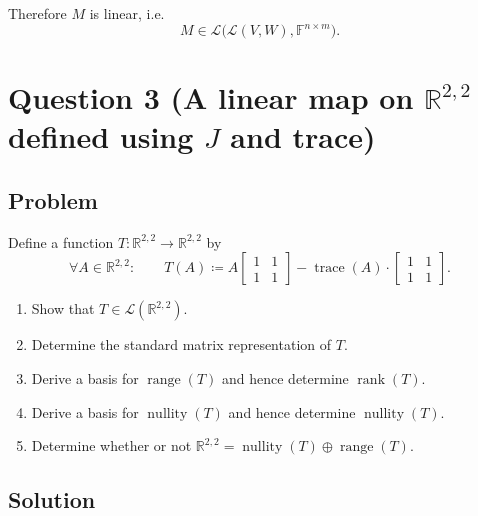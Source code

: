 \documentclass[12pt]{article}
\newcommand{\F}{\mathbb{F}}
\newcommand{\R}{\mathbb{R}}
\newcommand{\cL}{\mathcal{L}}
\DeclareMathOperator{\Range}{range}
\DeclareMathOperator{\Rank}{rank}
\DeclareMathOperator{\Nullity}{nullity}
\DeclareMathOperator{\Null}{nullity}
\DeclareMathOperator{\tr}{trace}
\begin{document}
Therefore $M$ is linear, i.e.
\[
\boxed{
M \in \cL\bigl(\cL(V,W),\F^{n\times m}\bigr).
}
\]



\newpage
\section{Question 3 (A linear map on \(\R^{2,2}\) defined using \(J\) and trace)}
\subsection{Problem}
Define a function \(T:\R^{2,2}\to\R^{2,2}\) by
\[
\forall A\in\R^{2,2}:\qquad
T(A)\coloneqq A
\begin{bmatrix}1&1\\1&1\end{bmatrix}
-\tr(A)\cdot
\begin{bmatrix}1&1\\1&1\end{bmatrix}.
\]
\begin{enumerate}[label=(\alph*)]
\item Show that \(T\in \cL(\R^{2,2})\).
\item Determine the standard matrix representation of \(T\).
\item Derive a basis for \(\Range(T)\) and hence determine \(\Rank(T)\).
\item Derive a basis for \(\Null(T)\) and hence determine \(\Nullity(T)\).
\item Determine whether or not \(\R^{2,2}=\Null(T)\oplus \Range(T)\).
\end{enumerate}

\subsection{Solution}
\end{document}

